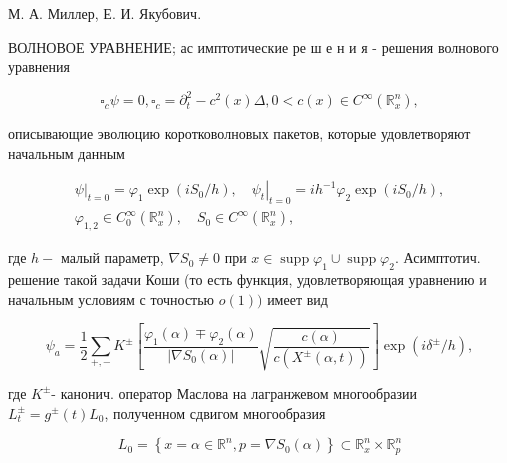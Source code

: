 \documentclass[10pt]{article}
\begin{document}
М. А. Миллер, Е. И. Якубович.



ВОЛНОВОЕ УРАВНЕНИЕ; ас имптотические ре ш е н и я - решения волнового уравнения



\[

\square_{c} \psi=0, \square_{c}=\partial_{t}^{2}-c^{2}(x) \Delta, 0<c(x) \in C^{\infty}\left(\mathbb{R}_{x}^{n}\right),

\]



описывающие эволюцию коротковолновых пакетов, которые удовлетворяют начальным данным



\[

\begin{gathered}

\left.\psi\right|_{t=0}=\varphi_{1} \exp \left(i S_{0} / h\right),\left.\quad \psi_{t}\right|_{t=0}=i h^{-1} \varphi_{2} \exp \left(i S_{0} / h\right), \\

\varphi_{1,2} \in C_{0}^{\infty}\left(\mathbb{R}_{x}^{n}\right), \quad S_{0} \in C^{\infty}\left(\mathbb{R}_{x}^{n}\right),

\end{gathered}

\]



где $h-$ малый параметр, $\nabla S_{0} \neq 0$ при $x \in \operatorname{supp} \varphi_{1} \cup \operatorname{supp} \varphi_{2}$. Асимптотич. решение такой задачи Коши (то есть функция, удовлетворяющая уравнению и начальным условиям с точностью $o(1))$ имеет вид



\[

\psi_{a}=\frac{1}{2} \sum_{+,-} K^{ \pm}\left[\frac{\varphi_{1}(\alpha) \mp \varphi_{2}(\alpha)}{\left|\nabla S_{0}(\alpha)\right|} \sqrt{\frac{c(\alpha)}{c\left(X^{ \pm}(\alpha, t)\right)}}\right] \exp \left(i \delta^{ \pm} / h\right),

\]



где $K^{ \pm}$- канонич. оператор Маслова на лагранжевом многообразии $L_{t}^{ \pm}=g^{ \pm}(t) L_{0}$, полученном сдвигом многообразия



\[

L_{0}=\left\{x=\alpha \in \mathbb{R}^{n}, p=\nabla S_{0}(\alpha)\right\} \subset \mathbb{R}_{x}^{n} \times \mathbb{R}_{p}^{n}

\]
\end{document}
